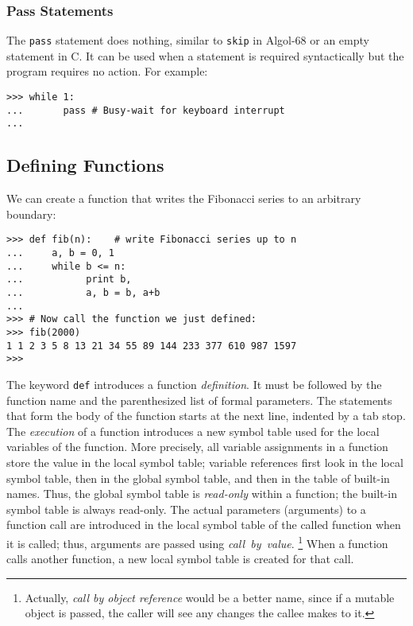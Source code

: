 \subsubsection{Pass Statements}

The {\tt pass} statement does nothing, similar to {\tt skip} in Algol-68
or an empty statement in C.
It can be used when a statement is required syntactically but the
program requires no action.
For example:
\begin{code}\begin{verbatim}
>>> while 1:
...       pass # Busy-wait for keyboard interrupt
... 
\end{verbatim}\end{code}

\subsection{Defining Functions}

We can create a function that writes the Fibonacci series to an
arbitrary boundary:
\begin{code}\begin{verbatim}
>>> def fib(n):    # write Fibonacci series up to n
...     a, b = 0, 1
...     while b <= n:
...           print b,
...           a, b = b, a+b
... 
>>> # Now call the function we just defined:
>>> fib(2000)
1 1 2 3 5 8 13 21 34 55 89 144 233 377 610 987 1597
>>> 
\end{verbatim}\end{code}
The keyword
{\tt def}
introduces a function
{\it definition}.
It must be followed by the function name and the parenthesized list of
formal parameters.
The statements that form the body of the function starts at the next
line, indented by a tab stop.
The
{\it execution}
of a function introduces a new symbol table used for the local variables
of the function.
More precisely, all variable assignments in a function store the value
in the local symbol table; variable references first look in the local
symbol table, then in the global symbol table, and then in the table of
built-in names.
Thus, the global symbol table is
{\it read-only}
within a function; the built-in symbol table is always read-only.
The actual parameters (arguments) to a function call are introduced in
the local symbol table of the called function when it is called;
thus, arguments are passed using
{\it call\ by\ value}.%
\footnote{
	 Actually, {\it call  by  object reference} would be a better
	 name, since if a mutable object is passed, the caller will see
	 any changes the callee makes to it.
}
When a function calls another function, a new local symbol table is
created for that call.

